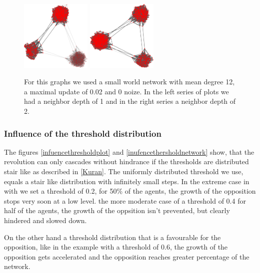 \begin{figure}
\includegraphics[width=0.3\textwidth]{batchRun__kHalf=6-6-6_maxUpdate=0.02_noize=0_nbrDepth=1/network1000-crop.pdf}
\hskip2cm
\includegraphics[width=0.3\textwidth]{batchRun__kHalf=6-6-6_maxUpdate=0.02_noize=0_nbrDepth=2/network1000-crop.pdf}

\caption{For this graphs we used a small world network with mean degree 12, a maximal update of 0.02 and 0 noize. In the left series of plots we had a neighbor depth of 1 and in the right series a neighbor depth of 2.}
\label{influencenbrdepth}
\end{figure}

\subsubsection{Influence of the threshold distribution}
\label{sec:influencethresholddistribution}

The figures \ref{infuencethresholdplot} and \ref{inufencethersholdnetwork} show, that the revolution can only cascades without hindrance if the thresholds are distributed stair like as described in \ref{Kuran}. The uniformly distributed threshold we use, equals a stair like distribution with infinitely small steps. In the extreme case in with we set a threshold of 0.2, for 50\% of the agents, the growth of the opposition stops very soon at a low level. the more moderate case of a threshold of 0.4 for half of the agents, the growth of the oppsition isn't prevented, but clearly hindered and slowed down.

On the other hand a threshold distribution that is a favourable for the opposition, like in the example with a threshold of 0.6, the growth of the opposition gets accelerated and the opposition reaches greater percentage of the network.  


